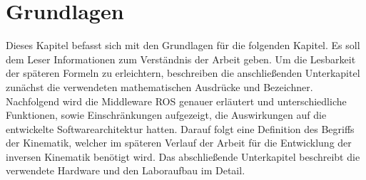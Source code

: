\section{Grundlagen}
\label{sec:basics}

Dieses Kapitel befasst sich mit den Grundlagen für die folgenden Kapitel. Es soll dem Leser Informationen zum Verständnis der Arbeit geben. Um die Lesbarkeit der späteren Formeln zu erleichtern, beschreiben die anschließenden Unterkapitel zunächst die verwendeten mathematischen Ausdrücke und Bezeichner. Nachfolgend wird die Middleware ROS genauer erläutert und unterschiedliche Funktionen, sowie Einschränkungen aufgezeigt, die Auswirkungen auf die entwickelte Softwarearchitektur hatten. Darauf folgt eine Definition des Begriffs der Kinematik, welcher im späteren Verlauf der Arbeit für die Entwicklung der inversen Kinematik benötigt wird. Das abschließende Unterkapitel beschreibt die verwendete Hardware und den Laboraufbau im Detail.



